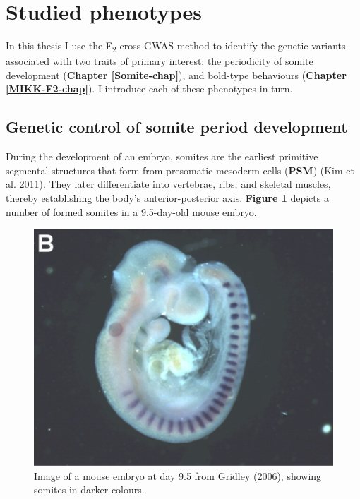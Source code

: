 \documentclass[
]{book}
\begin{document}
\hypertarget{studied-phenotypes}{%
\section{Studied phenotypes}\label{studied-phenotypes}}

In this thesis I use the F\textsubscript{2}-cross GWAS method to identify the genetic variants associated with two traits of primary interest: the periodicity of somite development (\textbf{Chapter \ref{Somite-chap}}), and bold-type behaviours (\textbf{Chapter \ref{MIKK-F2-chap}}). I introduce each of these phenotypes in turn.

\hypertarget{genetic-control-of-somite-period-development}{%
\subsection{Genetic control of somite period development}\label{genetic-control-of-somite-period-development}}

During the development of an embryo, somites are the earliest primitive segmental structures that form from presomatic mesoderm cells (\textbf{PSM}) (Kim et al. 2011). They later differentiate into vertebrae, ribs, and skeletal muscles, thereby establishing the body's anterior-posterior axis. \textbf{Figure \ref{fig:mouse-embryo}} depicts a number of formed somites in a 9.5-day-old mouse embryo.



\begin{figure}

{\centering \includegraphics[width=0.6\linewidth]{figs/somites/mouse_embryo_gridley} 

}

\caption{Image of a mouse embryo at day 9.5 from Gridley (2006), showing somites in darker colours.}\label{fig:mouse-embryo}
\end{figure}
\end{document}
